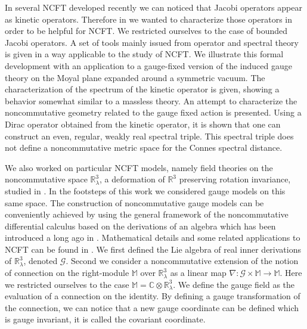 \documentclass[11pt]{book}
\newcommand{\Gcal}{\mathcal{G}}
\newcommand{\Cbb}{\mathbb{C}}
\newcommand{\Mbb}{\mathbb{M}}
\newcommand{\Rbb}{\mathbb{R}}
\theoremstyle{break}
\begin{document}
\bigskip


In several NCFT developed recently we can noticed that Jacobi operators appear as kinetic operators. Therefore in \cite{GW_2015} we wanted to characterize those operators in order to be helpful for NCFT. We restricted ourselves to the case of bounded Jacobi operators. A set of tools mainly issued from operator and spectral theory is given in a way applicable to the study of NCFT. We illustrate this formal development with an application to a gauge-fixed version of the induced gauge theory on the Moyal plane expanded around a symmetric vacuum. The characterization of the spectrum of the kinetic operator is given, showing a behavior somewhat similar to a massless theory. An attempt to characterize the noncommutative geometry related to the gauge fixed action is presented. Using a Dirac operator obtained from the kinetic operator, it is shown that one can construct an even, regular, weakly real spectral triple. This spectral triple does not define a noncommutative metric space for the Connes spectral distance.\par%


\bigskip


We also worked on particular NCFT models, namely field theories on the noncommutative space $\Rbb^3_\lambda$, a deformation of $\mathbb{R}^3$ preserving rotation invariance, studied in \cite{VW_2013}. In the footsteps of this work we considered gauge models on this same space.  The construction of noncommutative gauge models can be conveniently achieved by using the general framework of the noncommutative differential calculus based on the derivations of an algebra which has been introduced a long ago in \cite{DV_1999}. Mathematical details and some related applications to NCFT can be found in \cite{WALLET_2009}. We first defined the Lie algebra of real inner derivations of $\Rbb^3_\lambda$, denoted $\Gcal$. Second we consider a noncommutative extension of the notion of connection on the right-module $\Mbb$ over $\Rbb^3_\lambda$ as a linear map $\nabla : \Gcal \times \Mbb \to \Mbb$. Here we restricted ourselves to the case $\Mbb = \Cbb \otimes \Rbb^3_\lambda$. We define the gauge field as the evaluation of a connection on the identity. By defining a gauge transformation of the connection, we can notice that a new gauge coordinate can be defined which is gauge invariant, it is called the covariant coordinate.
\end{document}
